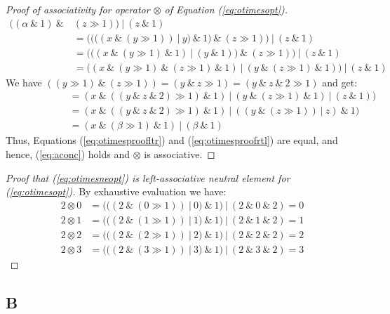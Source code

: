 \begin{proof}[Proof of associativity for operator $\otimes$ of Equation (\ref{eq:otimesopt})]
\begin{align}
  ((\alpha~\&~1)~\&~&(z \gg 1))~|~(z~\&~1) \\
               &= ((((x~\&~(y \gg 1))~|~y)~\&~1)~\&~(z \gg 1))~|~(z~\&~1) \\
               &= (((x~\&~(y \gg 1)~\&~1)~|~(y~\&~1))~\&~(z \gg 1))~|~(z~\&~1) \\
               &= ((x~\&~(y \gg 1)~\&~(z \gg 1)~\&~1)~|~(y~\&~(z \gg 1)~\&~1))~|~(z~\&~1)
\end{align}
We have $((y \gg 1)~\&~(z \gg 1)) = (y~\&~z \gg 1) = (y~\&~z~\&~2 \gg 1)$ and get:
\begin{align}
  &= (x~\&~((y~\&~z~\&~2) \gg 1)~\&~1)~|~(y~\&~(z \gg 1)~\&~1)~|~(z~\&~1))\\
  \phantom{((\alpha~\&~1)\&}&= (x~\&~((y~\&~z~\&~2) \gg 1)~\&~1)~|~((y~\&~(z \gg 1))~|~z)~\&~1)\\
  &= (x~\&~(\beta \gg 1)~\&~1)~|~(\beta~\&~1)
\end{align}
Thus, Equations (\ref{eq:otimesproofltr}) and (\ref{eq:otimesproofrtl}) are equal, and hence, (\ref{eq:aconc}) holds and $\otimes$ is associative.
\end{proof}

\begin{proof}[Proof that (\ref{eq:otimesneopt}) is left-associative neutral element for (\ref{eq:otimesopt})]\phantom{~}

  By exhaustive evaluation we have:
\begin{align}
  \label{eq:otimesneproof}
  2 \otimes 0 &= (((2~\&~(0 \gg 1))~|~0)~\&~1)~|~(2~\&~0~\&~2) = 0 \\
  2 \otimes 1 &= (((2~\&~(1 \gg 1))~|~1)~\&~1)~|~(2~\&~1~\&~2) = 1 \\
  2 \otimes 2 &= (((2~\&~(2 \gg 1))~|~2)~\&~1)~|~(2~\&~2~\&~2) = 2 \\
  2 \otimes 3 &= (((2~\&~(3 \gg 1))~|~3)~\&~1)~|~(2~\&~3~\&~2) = 3
\end{align}
\end{proof}

\subsection*{B}
\label{app:B}

